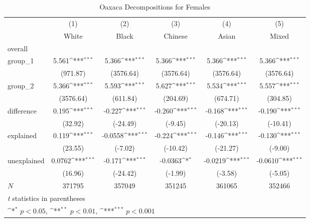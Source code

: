 \begin{table}[htbp]\centering
\def\sym#1{\ifmmode^{#1}\else\(^{#1}\)\fi}
\caption{Oaxaca Decompositions for Females\label{tab1}}
\begin{tabular}{l*{5}{c}}
\hline\hline
            &\multicolumn{1}{c}{(1)}&\multicolumn{1}{c}{(2)}&\multicolumn{1}{c}{(3)}&\multicolumn{1}{c}{(4)}&\multicolumn{1}{c}{(5)}\\
            &\multicolumn{1}{c}{White}&\multicolumn{1}{c}{Black}&\multicolumn{1}{c}{Chinese}&\multicolumn{1}{c}{Asian}&\multicolumn{1}{c}{Mixed}\\
\hline
overall     &                     &                     &                     &                     &                     \\
group\_1     &       5.561\sym{***}&       5.366\sym{***}&       5.366\sym{***}&       5.366\sym{***}&       5.366\sym{***}\\
            &    (971.87)         &   (3576.64)         &   (3576.64)         &   (3576.64)         &   (3576.64)         \\
group\_2     &       5.366\sym{***}&       5.593\sym{***}&       5.627\sym{***}&       5.534\sym{***}&       5.557\sym{***}\\
            &   (3576.64)         &    (611.84)         &    (204.69)         &    (674.71)         &    (304.85)         \\
difference  &       0.195\sym{***}&      -0.227\sym{***}&      -0.260\sym{***}&      -0.168\sym{***}&      -0.190\sym{***}\\
            &     (32.92)         &    (-24.49)         &     (-9.45)         &    (-20.13)         &    (-10.41)         \\
explained   &       0.119\sym{***}&     -0.0558\sym{***}&      -0.224\sym{***}&      -0.146\sym{***}&      -0.130\sym{***}\\
            &     (23.55)         &     (-7.02)         &    (-10.42)         &    (-21.27)         &     (-9.00)         \\
unexplained &      0.0762\sym{***}&      -0.171\sym{***}&     -0.0363\sym{*}  &     -0.0219\sym{***}&     -0.0610\sym{***}\\
            &     (16.96)         &    (-24.42)         &     (-1.99)         &     (-3.58)         &     (-5.05)         \\
\hline
\(N\)       &      371795         &      357049         &      351245         &      361065         &      352466         \\
\hline\hline
\multicolumn{6}{l}{\footnotesize \textit{t} statistics in parentheses}\\
\multicolumn{6}{l}{\footnotesize \sym{*} \(p<0.05\), \sym{**} \(p<0.01\), \sym{***} \(p<0.001\)}\\
\end{tabular}
\end{table}
